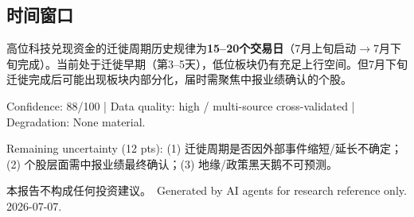 \documentclass[a4paper,11pt,fontset=none]{ctexart}
\newcommand{\reportdisclaimer}{本报告不构成任何投资建议。}
\begin{document}
\subsection*{时间窗口}

高位科技兑现资金的迁徙周期历史规律为\textbf{15--20个交易日}（7月上旬启动$\to$7月下旬完成）。当前处于迁徙早期（第3--5天），低位板块仍有充足上行空间。但7月下旬迁徙完成后可能出现板块内部分化，届时需聚焦中报业绩确认的个股。

\vfill
\begin{disclosurebox}[Metadata]
\footnotesize
Confidence: 88/100 \quad | \quad
Data quality: high / multi-source cross-validated \quad | \quad
Degradation: None material.

\vspace{0.3em}
Remaining uncertainty (12 pts): (1) 迁徙周期是否因外部事件缩短/延长不确定；(2) 个股层面需中报业绩最终确认；(3) 地缘/政策黑天鹅不可预测。

\vspace{0.4em}
{\tiny\reportdisclaimer\ Generated by AI agents for research reference only. 2026-07-07.}
\end{disclosurebox}
\end{document}
